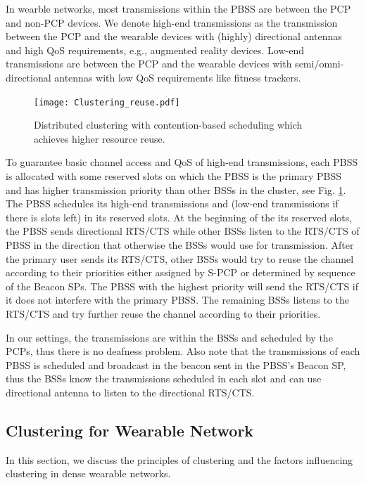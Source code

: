 \documentclass[10pt, conference, letterpaper]{IEEEtran}
\begin{document}
In wearble networks, most transmissions within the PBSS are between the PCP and non-PCP devices. We denote high-end transmissions as the transmission between the PCP and the wearable devices with (highly) directional antennas and high QoS requirements, e.g., augmented reality devices. Low-end transmissions are between the PCP and the wearable devices with semi/omni-directional antennas with low QoS requirements like fitness trackers. 

\begin{figure}
	\centering
	\texttt{[image: Clustering\_reuse.pdf]}
	\caption{Distributed clustering  with contention-based scheduling which achieves higher resource reuse.}
	\label{fig:clustering:reuse}
\end{figure}

To guarantee basic channel access and QoS of high-end transmissions, each PBSS is allocated with some reserved slots on which the PBSS is the primary PBSS and has higher transmission priority than other BSSs in the cluster, see Fig. \ref{fig:clustering:reuse}. The PBSS schedules its high-end transmissions and (low-end transmissions if there is slots left) in its reserved slots. At the beginning of the its reserved slots, the PBSS sends directional RTS/CTS while other BSSs listen to the RTS/CTS of PBSS in the direction that otherwise the BSSs would use for transmission. After the primary user sends its RTS/CTS, other BSSs would try to reuse the channel according to their priorities either assigned by S-PCP or determined by sequence of the Beacon SPs. The PBSS with the highest priority will send the RTS/CTS if it does not interfere with the primary PBSS. The remaining BSSs listens to the RTS/CTS and try further reuse the channel according to their priorities. 

In our settings, the transmissions are within the BSSs and scheduled by the PCPs, thus there is no deafness problem. Also note that the transmissions of each PBSS is scheduled and broadcast in the beacon sent in the PBSS's Beacon SP, thus the BSSs know the transmissions scheduled in each slot and can use directional antenna to listen to the directional RTS/CTS. 

\subsection{Clustering for Wearable Network}\label{section:MAC:clustering}
In this section, we discuss the principles of clustering and the factors influencing clustering in dense wearable networks.
\end{document}
